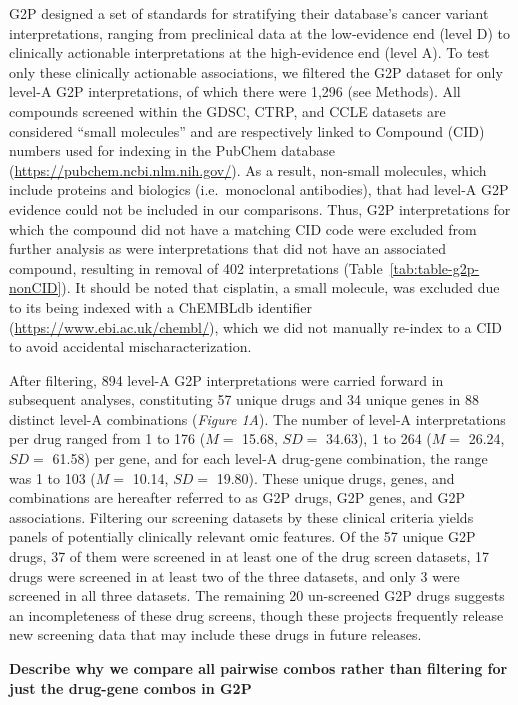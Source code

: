 \documentclass[man,floatsintext]{apa6}
\begin{document}
G2P designed a set of standards for stratifying their database's cancer
variant interpretations, ranging from preclinical data at the
low-evidence end (level D) to clinically actionable interpretations at
the high-evidence end (level A). To test only these clinically
actionable associations, we filtered the G2P dataset for only level-A
G2P interpretations, of which there were 1,296 (see Methods). All
compounds screened within the GDSC, CTRP, and CCLE datasets are
considered \enquote{small molecules} and are respectively linked to
Compound (CID) numbers used for indexing in the PubChem database
(\url{https://pubchem.ncbi.nlm.nih.gov/}). As a result, non-small
molecules, which include proteins and biologics (i.e.~monoclonal
antibodies), that had level-A G2P evidence could not be included in our
comparisons. Thus, G2P interpretations for which the compound did not
have a matching CID code were excluded from further analysis as were
interpretations that did not have an associated compound, resulting in
removal of 402 interpretations (Table~\ref{tab:table-g2p-nonCID}). It
should be noted that cisplatin, a small molecule, was excluded due to
its being indexed with a ChEMBLdb identifier
(\url{https://www.ebi.ac.uk/chembl/}), which we did not manually
re-index to a CID to avoid accidental mischaracterization.

After filtering, 894 level-A G2P interpretations were carried forward in
subsequent analyses, constituting 57 unique drugs and 34 unique genes in
88 distinct level-A combinations (\emph{Figure 1A}). The number of
level-A interpretations per drug ranged from 1 to 176 (\(M =\) 15.68,
\(SD =\) 34.63), 1 to 264 (\(M =\) 26.24, \(SD =\) 61.58) per gene, and
for each level-A drug-gene combination, the range was 1 to 103 (\(M =\)
10.14, \(SD =\) 19.80). These unique drugs, genes, and combinations are
hereafter referred to as G2P drugs, G2P genes, and G2P associations.
Filtering our screening datasets by these clinical criteria yields
panels of potentially clinically relevant omic features. Of the 57
unique G2P drugs, 37 of them were screened in at least one of the drug
screen datasets, 17 drugs were screened in at least two of the three
datasets, and only 3 were screened in all three datasets. The remaining
20 un-screened G2P drugs suggests an incompleteness of these drug
screens, though these projects frequently release new screening data
that may include these drugs in future releases.

\textbf{Describe why we compare all pairwise combos rather than
filtering for just the drug-gene combos in G2P}
\end{document}
